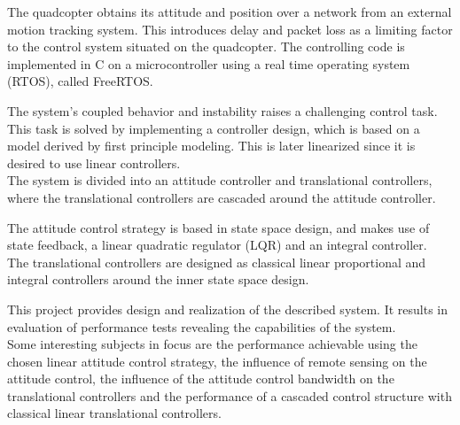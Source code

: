 The quadcopter obtains its attitude and position over a network from an external motion tracking system. This introduces delay and packet loss as a limiting factor to the control system situated on the quadcopter. The controlling code is implemented in C on a microcontroller using a real time operating system (RTOS), called FreeRTOS.

The system's coupled behavior and instability raises a challenging control task. This task is solved by implementing a controller design, which is based on a model derived by first principle modeling. This is later linearized since it is desired to use linear controllers.\\
The system is divided into an attitude controller and translational controllers, where the translational controllers are cascaded around the attitude controller.

The attitude control strategy is based in state space design, and makes use of state feedback, a linear quadratic regulator (LQR) and an integral controller.\\
The translational controllers are designed as classical linear proportional and integral controllers around the inner state space design.

This project provides design and realization of the described system. It results in evaluation of performance tests revealing the capabilities of the system.\\
Some interesting subjects in focus are the performance achievable using the chosen linear attitude control strategy, the influence of remote sensing on the attitude control, the influence of the attitude control bandwidth on the translational controllers and the performance of a cascaded control structure with classical linear translational controllers.